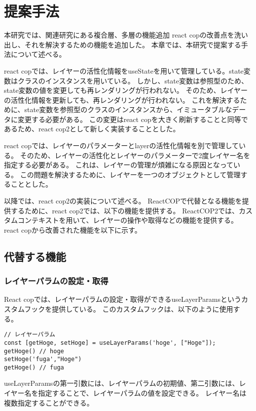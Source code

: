 \documentclass{jsarticle}
\begin{document}
\fi
\section{提案手法}
本研究では、関連研究にある複合層、多層の機能追加
react copの改善点を洗い出し、それを解決するための機能を追加した。
本章では、本研究で提案する手法について述べる。

react copでは、レイヤーの活性化情報をuseStateを用いて管理している。state変数はクラスのインスタンスを用いている。
しかし、state変数は参照型のため、state変数の値を変更しても再レンダリングが行われない。
そのため、レイヤーの活性化情報を更新しても、再レンダリングが行われない。
これを解決するために、state変数を参照型のクラスのインスタンスから、イミュータブルなデータに変更する必要がある。
この変更はreact copを大きく刷新することと同等であるため、react cop2として新しく実装することとした。

react copでは、レイヤーのパラメーターとlayerの活性化情報を別で管理している。
そのため、レイヤーの活性化とレイヤーのパラメーターで2度レイヤー名を指定する必要がある。
これは、レイヤーの管理が煩雑になる原因となっている。
この問題を解決するために、レイヤーを一つのオブジェクトとして管理することとした。

以降では、react cop2の実装について述べる。
ReactCOPで代替となる機能を提供するために、react cop2では、以下の機能を提供する。
ReactCOP2では、カスタムコンテキストを用いて、レイヤーの操作や取得などの機能を提供する。
react copから改善された機能を以下に示す。



\subsection{代替する機能}
\subsubsection{レイヤーパラムの設定・取得}
React copでは、レイヤーパラムの設定・取得ができるuseLayerParamsというカスタムフックを提供している。
このカスタムフックは、以下のように使用する。
\begin{lstlisting}[]
// レイヤーパラム
const [getHoge, setHoge] = useLayerParams('hoge', ["Hoge"]);
getHoge() // hoge
setHoge('fuga',"Hoge")
getHoge() // fuga

\end{lstlisting}
useLayerParamsの第一引数には、レイヤーパラムの初期値、第二引数には、レイヤー名を指定することで、レイヤーパラムの値を設定できる。
レイヤー名は複数指定することができる。
\end{document}

